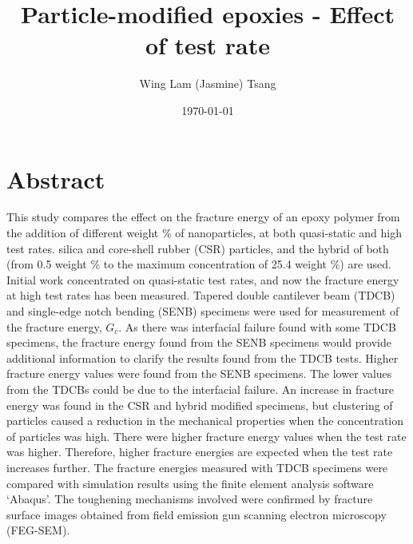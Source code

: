 \documentclass[numbers=noendperiod,chapterprefix=on]{icldt} %
\newcommand{\HRule}{\rule{\linewidth}{0.5mm}}
\begin{document}
\title{Particle-modified epoxies - Effect of test rate}

\author{Wing Lam (Jasmine) Tsang}
\date{\today}

\maketitle
\newpage



\chapter*{Abstract}

This study compares the effect on the fracture energy of an epoxy polymer from the addition of different weight \% of nanoparticles, at both quasi-static and high test rates. 
silica and core-shell rubber (CSR) particles, and the hybrid of both (from 0.5 weight \% to the maximum concentration of 25.4 weight \%) are used. Initial work concentrated on quasi-static test rates, and now the fracture energy at high test rates has been measured. Tapered double cantilever beam (TDCB) and single-edge notch bending (SENB) specimens were used for measurement of the fracture energy, $G_c$. As there was interfacial failure found with some TDCB specimens, the fracture energy found from the SENB specimens would provide additional information to clarify the results found from the TDCB tests. Higher fracture energy values were found from the SENB specimens. The lower values from the TDCBs could be due to the interfacial failure. An increase in fracture energy was found in the CSR and hybrid modified specimens, but clustering of particles caused a reduction in the mechanical properties when the concentration of particles was high. There were higher fracture energy values when the test rate was higher. Therefore, higher fracture energies are expected when the test rate increases further.
The fracture energies measured with TDCB specimens were compared with simulation results using the finite element analysis software ‘Abaqus'. The toughening mechanisms involved were confirmed by fracture surface images obtained from field emission gun scanning electron microscopy (FEG-SEM). 
\end{document}
